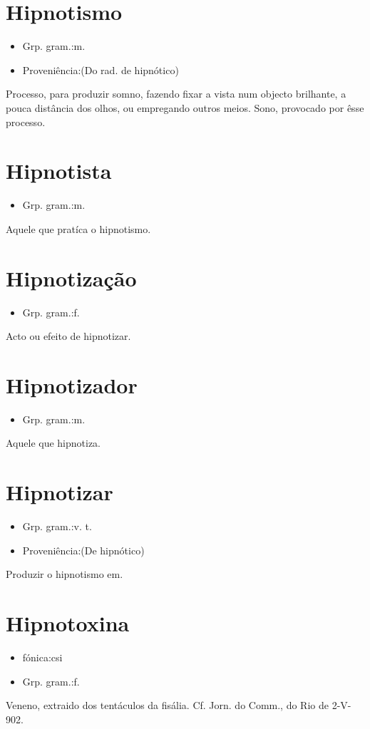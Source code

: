 \documentclass{article}
\begin{document}
\section{Hipnotismo}
\begin{itemize}
\item {Grp. gram.:m.}
\end{itemize}
\begin{itemize}
\item {Proveniência:(Do rad. de \textunderscore hipnótico\textunderscore )}
\end{itemize}
Processo, para produzir somno, fazendo fixar a vista num objecto brilhante, a pouca distância dos olhos, ou empregando outros meios.
Sono, provocado por êsse processo.
\section{Hipnotista}
\begin{itemize}
\item {Grp. gram.:m.}
\end{itemize}
Aquele que pratíca o hipnotismo.
\section{Hipnotização}
\begin{itemize}
\item {Grp. gram.:f.}
\end{itemize}
Acto ou efeito de hipnotizar.
\section{Hipnotizador}
\begin{itemize}
\item {Grp. gram.:m.}
\end{itemize}
Aquele que hipnotiza.
\section{Hipnotizar}
\begin{itemize}
\item {Grp. gram.:v. t.}
\end{itemize}
\begin{itemize}
\item {Proveniência:(De \textunderscore hipnótico\textunderscore )}
\end{itemize}
Produzir o hipnotismo em.
\section{Hipnotoxina}
\begin{itemize}
\item {fónica:csi}
\end{itemize}
\begin{itemize}
\item {Grp. gram.:f.}
\end{itemize}
Veneno, extraido dos tentáculos da fisália. Cf. \textunderscore Jorn. do Comm.\textunderscore , do Rio de 2-V-902.
\end{document}
